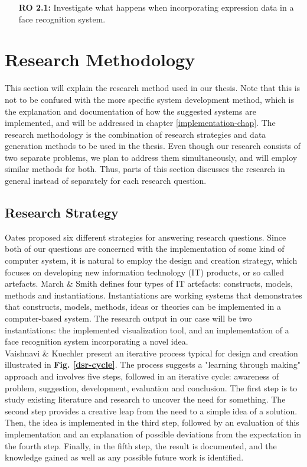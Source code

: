 \begin{enumerate}[align=left, labelwidth=3.5em, leftmargin=!, itemindent=0em]
    \item[\textbf{RO 2.1:}]Investigate what happens when incorporating expression data in a face recognition system. \label{last-item}
\end{enumerate}

\section{Research Methodology}

This section will explain the research method used in our thesis. Note that this is not to be confused with the more specific system development method, which is the explanation and documentation of how the suggested systems are implemented, and will be addressed in chapter \ref{implementation-chap}. The research methodology is the combination of research strategies and data generation methods to be used in the thesis. Even though our research consists of two separate problems, we plan to address them simultaneously, and will employ similar methods for both. Thus, parts of this section discusses the research in general instead of separately for each research question.

\subsection{Research Strategy}

Oates\cite{oates} proposed six different strategies for answering research questions. Since both of our questions are concerned with the implementation of some kind of computer system, it is natural to employ the design and creation strategy, which focuses on developing new information technology (IT) products, or so called artefacts. March \& Smith\cite{march-smith} defines four types of IT artefacts: constructs, models, methods and instantiations. Instantiations are working systems that demonstrates that constructs, models, methods, ideas or theories can be implemented in a computer-based system. The research output in our case will be two instantiations: the implemented visualization tool, and an implementation of a face recognition system incorporating a novel idea. \\

\noindent Vaishnavi \& Kuechler\cite{designscience} present an iterative process typical for design and creation illustrated in \textbf{Fig. \ref{dsr-cycle}}. The process suggests a "learning through making" approach and involves five steps, followed in an iterative cycle: awareness of problem, suggestion, development, evaluation and conclusion. The first step is to study existing literature and research to uncover the need for something. The second step provides a creative leap from the need to a simple idea of a solution. Then, the idea is implemented in the third step, followed by an evaluation of this implementation and an explanation of possible deviations from the expectation in the fourth step. Finally, in the fifth step, the result is documented, and the knowledge gained as well as any possible future work is identified. \\


